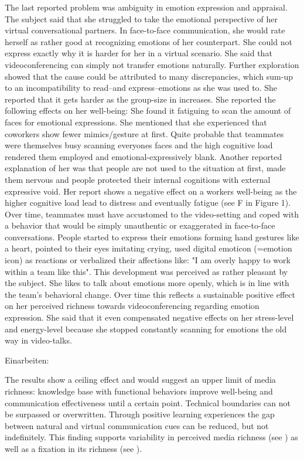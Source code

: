 \documentclass[man]{apa7}
\begin{document}
The last reported problem was ambiguity in emotion expression and appraisal. The subject said that she struggled to take the emotional perspective of her virtual conversational partners. In face-to-face communication, she would rate herself as rather good at recognizing emotions of her counterpart. She could not express exactly why it is harder for her in a virtual scenario. She said that videoconferencing can simply not transfer emotions naturally. Further exploration showed that the cause could be attributed to many discrepancies, which sum-up to an incompatibility to read–and express–emotions as she was used to. She reported that it gets harder as the group-size in increases. She reported the following effects on her well-being: She found it fatiguing to scan the amount of faces for emotional expressions. She mentioned that she experienced that coworkers show fewer mimics/gesture at first. Quite probable that teammates were themselves busy scanning everyones faces and the high cognitive load rendered them employed and emotional-expressively blank. Another reported explanation of her was that people are not used to the situation at first, made them nervous and people protected their internal cognitions with external expressive void. Her report shows a negative effect on a workers well-being as the higher cognitive load lead to distress and eventually fatigue (see F in Figure 1). Over time, teammates must have accustomed to the video-setting and coped with a behavior that would be simply unauthentic or exaggerated in face-to-face conversations. People started to express their emotions forming hand gestures like a heart, pointed to their eyes imitating crying, used digital emoticon (=emotion icon) as reactions or verbalized their affections like: "I am overly happy to work within a team like this". This development was perceived as rather pleasant by the subject. She likes to talk about emotions more openly, which is in line with the team's behavioral change. Over time this reflects a sustainable positive effect on her perceived richness towards videoconferencing regarding emotion expression. She said that it even compensated negative effects on her stress-level and energy-level because she stopped constantly scanning for emotions the old way in video-talks.

Einarbeiten:

The results show a ceiling effect and would suggest an upper limit of media richness: knowledge base with functional behaviors improve well-being and communication effectiveness until a certain point. Technical boundaries can not be surpassed or overwritten. Through positive learning experiences the gap between natural and virtual communication cues can be reduced, but not indefinitely. This finding supports variability in perceived media richness (see \cite{Kock2005}) as well as a fixation in its richness (see \cite{daft1983information}).
\end{document}
